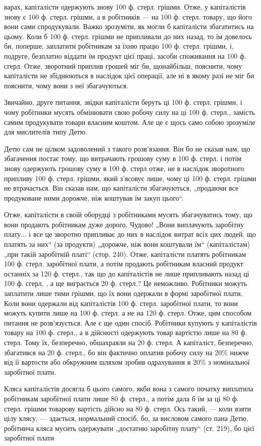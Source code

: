 варах, капіталісти одержують знову 100 ф. стерл. грішми. Отже, у капіталістів
знову є 100 ф. стерл. грішми, а в робітників — на 100 ф. стерл.
товару, що його вони сами спродукували. Важко зрозуміти, як могли б
капіталісти збагатитись на цьому. Коли б 100 ф. стерл. грішми не припливали
до них назад, то їм довелось би, поперше, заплатити робітникам
за їхню працю 100 ф. стерл. грішми, і, подруге, безплатно віддати
їм продукт цієї праці, засоби споживання на 100 ф. сгерл. Отже, зворотний
приплив грошей міг би, щонайбільш, пояснити, чому капіталісти
не збіднюються в наслідок цієї операції, але ні в якому разі не міг би
пояснити, чому вони з неї збагачуються.

Звичайно, друге питання, звідки капіталісти беруть ці 100 ф. стерл.
грішми, і чому робітники мусять обмінювати свою робочу силу на ці 100 ф.
стерл., замість самим продукувати товари власним коштом. Але це є щось
само собою зрозуміле для мислителів типу Детю.

Детю сам не цілком задоволений з такого розв’язання. Він бо не
сказав нам, що збагачення постає тому, що витрачають грошову суму
в 100 ф. стерл. і потім знову одержують грошову суму в 100 ф. стерл
отже, не в наслідок зворотного припливу 100 ф. стерл. грішми, який
з’ясовує лише, чому ці 100 ф. стерл. грішми не втрачається. Він сказав
нам, що капіталісти збагачуються, „продаючи все продуковане ними
дорожче, ніж коштував їм закуп цього“.

Отже, капіталісти в своїй оборудці з робітниками мусять збагачуватись
тому, що вони продають робітникам дуже дорого. Чудово! „Вони
виплачують заробітну плату... і все це зворотно припливає до них в наслідок
витрат всіх цих людей, що платять за них“ (за продукти) „дорожче,
ніж вони коштували їм“ (капіталістам) „при такій заробітній
платі“ (стор. 240). Отже, капіталісти платять робітникам 100 ф.
стерл. заробітної плати, а потім продають робітникам власний продукт
останніх за 120 ф. стерл., так що до капіталістів не лише припливають
назад ці 100 ф. сгерл, , а ще виграється 20 ф. стерл.? Це неможливо.
Робітники можуть заплатити лише тими грішми, що їх вони одержали
в формі заробітної плати. Коли вони одержали від капіталістів 100 ф.
стерл. заробітної плати, то вони можуть купити лише на 100 ф. стерл.
а не на 120 ф. стерл. Отже, цим способом питання не розв’язується. Але
є ще один спосіб. Робітники купують у капіталістів товару на 100 ф.
стерл., а в дійсності одержують товар вартістю лише на 80 ф. стерл.
Тому їх, безперечно, обшахраяли на 20 ф. стерл. А капіталіст, безперечно,
збагатився на 20 ф. стерл., бо він фактично оплатив робочу силу
на 20\% нижче від її вартости або обкружним шляхом зробив одрахування
в 20\% з номінальної заробітної плати.

Кляса капіталістів досягла б цього самого, якби вона з самого початку
виплатила робітникам заробітної плати лише 80 ф. стерл., а потім
дала б їм за ці 80 ф. стерл. грішми товарову вартість дійсно на 80 ф.
стерл. Ось такий, — коли взяти цілу клясу, — здається, нормальний спосіб,
бо, за висловом самого пана Детю, робітнича кляса мусить одержувати
„достатню заробітну плату“ (ст. 219), бо цієї заробітної плати
